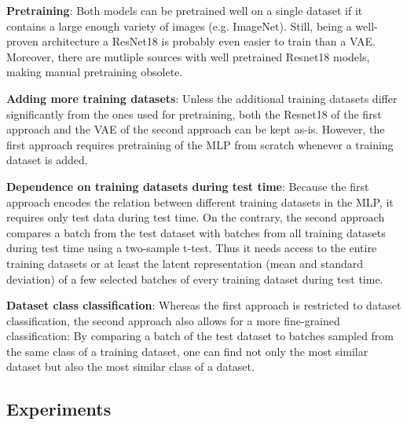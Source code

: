 \documentclass{article}
\begin{document}
\textbf{Pretraining}: Both models can be pretrained well on a single dataset if it contains a large enough variety of images (e.g. ImageNet). Still, being a well-proven architecture a ResNet18 is probably even easier to train than a VAE. Moreover, there are mutliple sources with well pretrained Resnet18 models, making manual pretraining obsolete.

\textbf{Adding more training datasets}: Unless the additional training datasets differ significantly from the ones used for pretraining, both the Resnet18 of the first approach and the VAE of the second approach can be kept as-is. However, the first approach requires pretraining of the MLP from scratch whenever a training dataset is added.

\textbf{Dependence on training datasets during test time}: Because the first approach encodes the relation between different training datasets in the MLP, it requires only test data during test time. On the contrary, the second approach compares a batch from the test dataset with batches from all training datasets during test time using a two-sample t-test. Thus it needs access to the entire training datasets or at least the latent representation (mean and standard deviation) of a few selected batches of every training dataset during test time. 

\textbf{Dataset class classification}: Whereas the first approach is restricted to dataset classification, the second approach also allows for a more fine-grained classification: By comparing a batch of the test dataset to batches sampled from the same class of a training dataset, one can find not only the most similar dataset but also the most similar class of a dataset.

\subsection{Experiments}
\label{sec:experiments}
\end{document}
